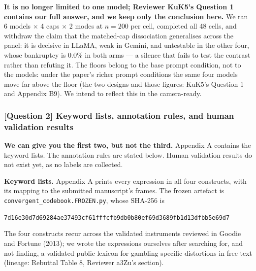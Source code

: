 \textbf{It is no longer limited to one model; Reviewer KuK5's Question 1 contains our full
answer, and we keep only the conclusion here.} We ran 6 models $\times$ 4 caps $\times$ 2 modes
at $n = 200$ per cell, completed all 48 cells, and withdraw the claim that the matched-cap
dissociation generalises across the panel: it is decisive in LLaMA, weak in Gemini, and
untestable in the other four, whose bankruptcy is 0.0\% in both arms --- a silence that fails
to test the contrast rather than refuting it. The floors belong to the base prompt condition,
not to the models: under the paper's richer prompt conditions the same four models move far
above the floor (the two designs and those figures: KuK5's Question 1 and Appendix B9). We
intend to reflect this in the camera-ready.


\subsubsection*{\textbf{[Question 2]} Keyword lists, annotation rules, and human validation results}

\textbf{We can give you the first two, but not the third.} Appendix A contains the keyword
lists. The annotation rules are stated below. Human validation results do not exist yet, as no
labels are collected.

\vspace{0.3em}
\noindent\textbf{Keyword lists.} Appendix A prints every expression in all four constructs, with
its mapping to the submitted manuscript's frames. The frozen artefact is
\texttt{convergent\_codebook.FROZEN.py}, whose SHA-256 is

\begin{center}
\footnotesize\texttt{7d16e30d7d69284ae37493cf61fffcfb9db0b80ef69d3689fb1d13dfbb5e69d7}
\end{center}

\noindent
The four constructs recur across the validated instruments reviewed in Goodie and Fortune
(2013); we wrote the expressions ourselves after searching for, and not finding, a validated
public lexicon for gambling-specific distortions in free text (lineage: Rebuttal Table 8,
Reviewer a3Zu's section).

